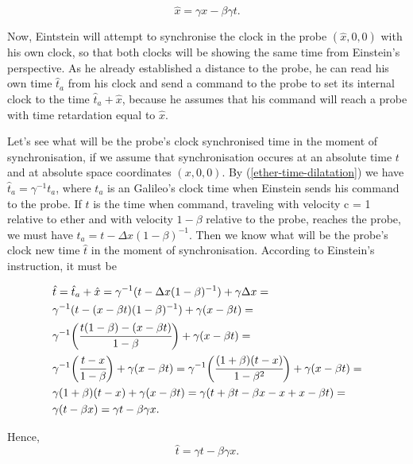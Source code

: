 \documentclass[main.tex]{subfiles}
\begin{document}
\begin{equation}
\hat{x} = \gamma x - \beta\gamma t.
\end{equation}

Now, Eintstein will attempt to synchronise the clock in the probe $(\hat{x}, 0, 0)$ with his own clock, so that both clocks will be showing the same time from Einstein's perspective. As he already established a distance to the probe, he can read his own time $\hat{t}_a$ from his clock and send a command to the probe to set its internal clock to the time $\hat{t}_a + \hat{x}$, because he assumes that his command will reach a probe with time retardation equal to $\hat{x}$. 

Let's see what will be the probe's clock synchronised time in the moment of synchronisation, if we assume that synchronisation occures at an absolute time $t$ and at absolute space coordinates $(x, 0, 0)$. By (\ref{ether-time-dilatation}) we have $\hat{t}_a = \gamma^{-1} t_a$, where $t_a$ is an Galileo's clock time when Einstein sends his command to the probe. If $t$ is the time when command, traveling with velocity c = 1 relative to ether and with velocity $1 - \beta$ relative to the probe, reaches the probe, we must have $t_a = t - \Delta x (1 - \beta)^{-1}$. Then we know what will be the probe's clock new time $\hat{t}$ in the moment of synchronisation. According to Einstein's instruction, it must be

\begin{align*}
& \hat{t} = \hat{t}_a + \hat{x} = \gamma^{-1}(t - \Delta x (1 - \beta)^{-1}) + \gamma \Delta x = \\
& \gamma^{-1}(t - (x - \beta t) (1 - \beta)^{-1}) + \gamma (x - \beta t) = \\
& \gamma^{-1}\bigg( \cfrac{t(1 - \beta) - (x - \beta t)}{1 - \beta} \bigg) + \gamma (x - \beta t) = \\
& \gamma^{-1}\bigg( \cfrac{t - x}{1 - \beta} \bigg) + \gamma (x - \beta t) = 
\gamma^{-1}\bigg( \cfrac{(1 + \beta)(t - x)}{1 - \beta^2} \bigg) + \gamma (x - \beta t) = 
\\
& \gamma(1 + \beta)(t - x) + \gamma (x - \beta t) = \gamma(t + \beta t - \beta x - x + x -\beta t) = \\
& \gamma( t - \beta x) = \gamma t - \beta\gamma x.
\end{align*}

Hence,
\begin{equation}
\label{ether-lorentz-t}
\hat{t} = \gamma t - \beta\gamma x.
\end{equation}
\end{document}
